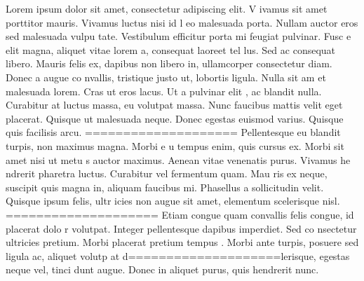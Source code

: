 Lorem ipsum dolor sit amet, consectetur adipiscing elit. V                                                            ivamus sit amet porttitor mauris. Vivamus luctus nisi id l                                                            eo malesuada porta. Nullam auctor eros sed malesuada vulpu                                                            tate. Vestibulum efficitur porta mi feugiat pulvinar. Fusc                                                            e elit magna, aliquet vitae lorem a, consequat laoreet tel                                                            lus. Sed ac consequat libero. Mauris felis ex, dapibus non                                                             libero in, ullamcorper consectetur diam. Donec a augue co                                                            nvallis, tristique justo ut, lobortis ligula. Nulla sit am                                                            et malesuada lorem. Cras ut eros lacus. Ut a pulvinar elit                                                            , ac blandit nulla. Curabitur at luctus massa, eu volutpat                                                             massa. Nunc faucibus mattis velit eget placerat. Quisque                                                             ut malesuada neque. Donec egestas euismod varius. Quisque                                                             quis facilisis arcu.
====================
Pellentesque eu blandit turpis, non maximus magna. Morbi e                                                            u tempus enim, quis cursus ex. Morbi sit amet nisi ut metu                                                            s auctor maximus. Aenean vitae venenatis purus. Vivamus he                                                            ndrerit pharetra luctus. Curabitur vel fermentum quam. Mau                                                            ris ex neque, suscipit quis magna in, aliquam faucibus mi.                                                             Phasellus a sollicitudin velit. Quisque ipsum felis, ultr                                                            icies non augue sit amet, elementum scelerisque nisl.
====================
Etiam congue quam convallis felis congue, id placerat dolo                                                            r volutpat. Integer pellentesque dapibus imperdiet. Sed co                                                            nsectetur ultricies pretium. Morbi placerat pretium tempus                                                            . Morbi ante turpis, posuere sed ligula ac, aliquet volutp                                                            at d====================lerisque, egestas neque vel, tinci                                                            dunt augue. Donec in aliquet purus, quis hendrerit nunc.
